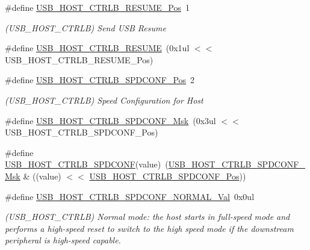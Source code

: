 \begin{DoxyCompactItemize}
\#define \mbox{\hyperlink{group___s_a_m_d21___u_s_b_gab5a679b92871cc0f3ba948f3d8191ec6}{U\+S\+B\+\_\+\+H\+O\+S\+T\+\_\+\+C\+T\+R\+L\+B\+\_\+\+R\+E\+S\+U\+M\+E\+\_\+\+Pos}}~1
\begin{DoxyCompactList}\small\item\em (U\+S\+B\+\_\+\+H\+O\+S\+T\+\_\+\+C\+T\+R\+LB) Send U\+SB Resume \end{DoxyCompactList}\item 
\#define \mbox{\hyperlink{group___s_a_m_d21___u_s_b_ga5f5b751377196419c6a558b5b2affb5c}{U\+S\+B\+\_\+\+H\+O\+S\+T\+\_\+\+C\+T\+R\+L\+B\+\_\+\+R\+E\+S\+U\+ME}}~(0x1ul $<$$<$ U\+S\+B\+\_\+\+H\+O\+S\+T\+\_\+\+C\+T\+R\+L\+B\+\_\+\+R\+E\+S\+U\+M\+E\+\_\+\+Pos)
\item 
\#define \mbox{\hyperlink{group___s_a_m_d21___u_s_b_gae5052bc689326f7ae2f3d3414ab4c294}{U\+S\+B\+\_\+\+H\+O\+S\+T\+\_\+\+C\+T\+R\+L\+B\+\_\+\+S\+P\+D\+C\+O\+N\+F\+\_\+\+Pos}}~2
\begin{DoxyCompactList}\small\item\em (U\+S\+B\+\_\+\+H\+O\+S\+T\+\_\+\+C\+T\+R\+LB) Speed Configuration for Host \end{DoxyCompactList}\item 
\#define \mbox{\hyperlink{group___s_a_m_d21___u_s_b_gad95fad89a2fe454c3f9ca72f890c56da}{U\+S\+B\+\_\+\+H\+O\+S\+T\+\_\+\+C\+T\+R\+L\+B\+\_\+\+S\+P\+D\+C\+O\+N\+F\+\_\+\+Msk}}~(0x3ul $<$$<$ U\+S\+B\+\_\+\+H\+O\+S\+T\+\_\+\+C\+T\+R\+L\+B\+\_\+\+S\+P\+D\+C\+O\+N\+F\+\_\+\+Pos)
\item 
\#define \mbox{\hyperlink{group___s_a_m_d21___u_s_b_ga25a4ce317b15a64b840749d499f2ae5a}{U\+S\+B\+\_\+\+H\+O\+S\+T\+\_\+\+C\+T\+R\+L\+B\+\_\+\+S\+P\+D\+C\+O\+NF}}(value)~(\mbox{\hyperlink{group___s_a_m_d21___u_s_b_gad95fad89a2fe454c3f9ca72f890c56da}{U\+S\+B\+\_\+\+H\+O\+S\+T\+\_\+\+C\+T\+R\+L\+B\+\_\+\+S\+P\+D\+C\+O\+N\+F\+\_\+\+Msk}} \& ((value) $<$$<$ \mbox{\hyperlink{group___s_a_m_d21___u_s_b_gae5052bc689326f7ae2f3d3414ab4c294}{U\+S\+B\+\_\+\+H\+O\+S\+T\+\_\+\+C\+T\+R\+L\+B\+\_\+\+S\+P\+D\+C\+O\+N\+F\+\_\+\+Pos}}))
\item 
\#define \mbox{\hyperlink{group___s_a_m_d21___u_s_b_ga42c2b2ba1944825832bb3ebe046512ba}{U\+S\+B\+\_\+\+H\+O\+S\+T\+\_\+\+C\+T\+R\+L\+B\+\_\+\+S\+P\+D\+C\+O\+N\+F\+\_\+\+N\+O\+R\+M\+A\+L\+\_\+\+Val}}~0x0ul
\begin{DoxyCompactList}\small\item\em (U\+S\+B\+\_\+\+H\+O\+S\+T\+\_\+\+C\+T\+R\+LB) Normal mode\+: the host starts in full-\/speed mode and performs a high-\/speed reset to switch to the high speed mode if the downstream peripheral is high-\/speed capable. \end{DoxyCompactList}\item 
$$
\end{DoxyCompactItemize}
